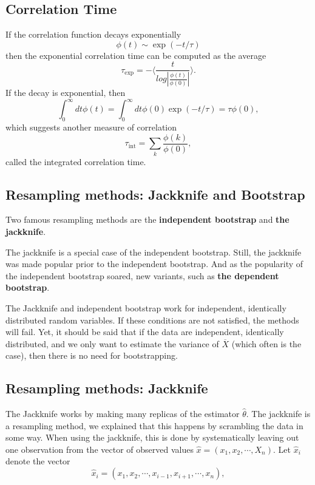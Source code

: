 \documentclass[%
oneside,                 %
final,                   %
10pt]{article}
\begin{document}
\subsection*{Correlation Time}

If the correlation function decays exponentially
\[ \phi (t) \sim \exp{(-t/\tau)}\]
then the exponential correlation time can be computed as the average
\[   \tau_{\mathrm{exp}}  =  -\langle  \frac{t}{log|\frac{\phi(t)}{\phi(0)}|} \rangle. \]
If the decay is exponential, then
\[  \int_0^{\infty} dt \phi(t)  = \int_0^{\infty} dt \phi(0)\exp{(-t/\tau)}  = \tau \phi(0),\] 
which  suggests another measure of correlation
\[   \tau_{\mathrm{int}} = \sum_k \frac{\phi(k)}{\phi(0)}, \]
called the integrated correlation time.

\subsection*{Resampling methods: Jackknife and Bootstrap}

Two famous
resampling methods are the \textbf{independent bootstrap} and \textbf{the jackknife}. 

The jackknife is a special case of the independent bootstrap. Still, the jackknife was made
popular prior to the independent bootstrap. And as the popularity of
the independent bootstrap soared, new variants, such as \textbf{the dependent bootstrap}.

The Jackknife and independent bootstrap work for
independent, identically distributed random variables.
If these conditions are not
satisfied, the methods will fail.  Yet, it should be said that if the data are
independent, identically distributed, and we only want to estimate the
variance of $\overline{X}$ (which often is the case), then there is no
need for bootstrapping. 

\subsection*{Resampling methods: Jackknife}

The Jackknife works by making many replicas of the estimator $\widehat{\theta}$. 
The jackknife is a resampling method, we explained that this happens by scrambling the data in some way. When using the jackknife, this is done by systematically leaving out one observation from the vector of observed values $\hat{x} = (x_1,x_2,\cdots,X_n)$. 
Let $\hat{x}_i$ denote the vector
\[
\hat{x}_i = (x_1,x_2,\cdots,x_{i-1},x_{i+1},\cdots,x_n),
\]
\end{document}
